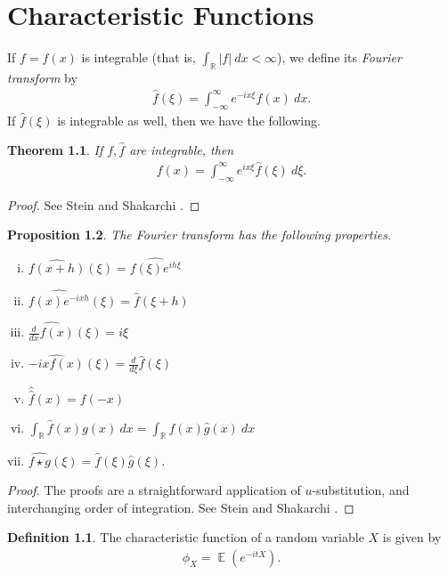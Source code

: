 \documentclass[12pt]{amsbook}
\newcommand{\rr}{\mathbb{R}}
\newcommand{\wh}{\widehat}
\DeclareMathOperator{\ex}{\mathbb{E}}
\theoremstyle{plain}
\newtheorem{theorem}{Theorem}
\newtheorem{proposition}[theorem]{Proposition}
\theoremstyle{definition}
\newtheorem*{definition}{Definition}
\theoremstyle{remark}
\numberwithin{equation}{section}  %
\numberwithin{equation}{section}  %
\begin{document}
	\chapter{Characteristic Functions}
	If $f = f(x)$ is integrable (that is, $\int_{\rr}| f | \ dx < \infty$), we define its \emph{Fourier transform} by
	\begin{equation*}
		\begin{split}
			\hat{f}(\xi) = \int_{-\infty}^{\infty} e^{-i x \xi} f(x) \ dx.
		\end{split}
	\end{equation*}
	If $ \hat{f}(\xi)$ is integrable as well, then we have the
	following.
	\begin{theorem}\label{thm:fourier-inversion}
		If $f, \hat{f}$ are integrable, then
		\begin{equation*}
			\begin{split}
				f(x) = \int_{-\infty}^{\infty} e^{i x \xi} \hat{f}(\xi) \ d \xi.
			\end{split}
		\end{equation*}
	\end{theorem}
	\begin{proof}
		See Stein and Shakarchi \cite{zbMATH02171466}.
	\end{proof}
	\begin{proposition}\label{prop:fourier-props}
		The Fourier transform has the following properties.
		\begin{enumerate}[(i)]
			\item	$\wh{f(x+h)}(\xi) = \wh{f(\xi) e^{i h \xi}}$
			\item $\wh{f(x) e^{-i x h}}(\xi) = \wh{f}(\xi + h)$	
			\item $\wh{\frac{d}{dx} f(x)}(\xi) = i \xi$
			\item $\wh{-ix f(x)}(\xi) = \frac{d}{d \xi}\wh{f}(\xi)$
			\item $\hat{\hat{f}}(x) = f(-x)$
			\item $\int_{\rr} \wh{f}(x) g(x) \ dx = \int_{\rr} f(x) \wh{g}(x) \ dx$
			\item $\wh{f \star g}(\xi) = \wh{f}(\xi) \wh{g}(\xi)$.
		\end{enumerate}
	\end{proposition}
	\begin{proof}
		The proofs are a straightforward
		application of $u$-substitution, and interchanging order of integration.
		See Stein and Shakarchi \cite{zbMATH02171466}. 
	\end{proof}
	\begin{definition}
		The characteristic function of a random variable $X$ is given by
		\begin{equation*}
			\begin{split}
				\phi_{X} = \ex(e^{-itX}).
			\end{split}
		\end{equation*}
	\end{definition}
\end{document}
